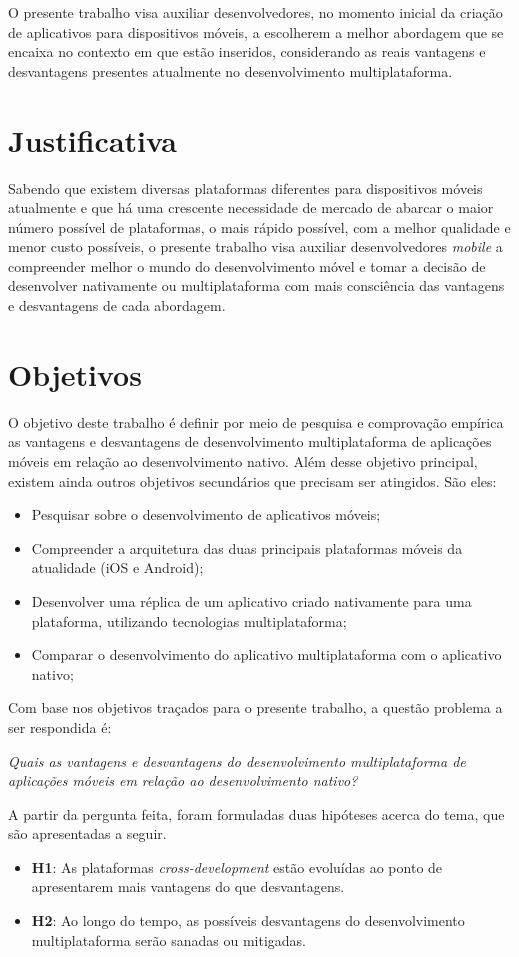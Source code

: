 O presente trabalho visa auxiliar desenvolvedores, no momento inicial da criação de aplicativos 
para dispositivos móveis, a escolherem a melhor abordagem que se encaixa no contexto em que estão inseridos,
considerando as reais vantagens e desvantagens presentes atualmente no desenvolvimento multiplataforma.

\section{Justificativa}\label{sec:justificativa}

Sabendo que existem diversas plataformas diferentes para dispositivos móveis atualmente e que há uma crescente 
necessidade de mercado de abarcar o maior número possível de plataformas, o mais rápido possível, com a
melhor qualidade e menor custo possíveis, o presente trabalho visa auxiliar desenvolvedores \textit{mobile} 
a compreender melhor o mundo do desenvolvimento móvel e tomar a decisão de 
desenvolver nativamente ou multiplataforma com mais consciência das vantagens e desvantagens de cada abordagem.

\section{Objetivos} \label{sec:objetivos}

O objetivo deste trabalho é definir por meio de pesquisa e comprovação empírica as vantagens e desvantagens de desenvolvimento multiplataforma de aplicações móveis em relação ao desenvolvimento nativo. 
Além desse objetivo principal, existem ainda outros objetivos secundários que precisam ser atingidos. São eles: 
\begin{itemize}
    \item Pesquisar sobre o desenvolvimento de aplicativos móveis;
    \item Compreender a arquitetura das duas principais plataformas móveis da atualidade (iOS e Android);
    \item Desenvolver uma réplica de um aplicativo criado nativamente para uma plataforma, utilizando tecnologias multiplataforma;
    \item Comparar o desenvolvimento do aplicativo multiplataforma com o aplicativo nativo;
\end{itemize}
Com base nos objetivos traçados para o presente trabalho, a questão problema a ser respondida é:
\begin{center}
    \textit{Quais as vantagens e desvantagens do desenvolvimento multiplataforma de aplicações móveis em relação ao desenvolvimento nativo?}
\end{center}
A partir da pergunta feita, foram formuladas duas hipóteses acerca do tema, que são apresentadas a seguir.
\begin{itemize}
    \item \textbf{H1}: As plataformas \textit{cross-development} estão evoluídas ao ponto de apresentarem mais vantagens do que desvantagens.
    \item \textbf{H2}: Ao longo do tempo, as possíveis desvantagens do desenvolvimento multiplataforma serão sanadas ou mitigadas.
\end{itemize}

